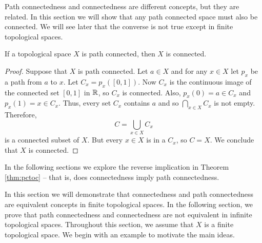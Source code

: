 \label{sec_connectedness}

Path connectedness and connectedness are different concepts, but they are related. In this section we will show that any path connected space must also be connected. We will see later that the converse is not true except in finite topological spaces. 

\begin{theorem} \label{thm:pctoc} If a topological space $X$ is path connected, then $X$ is connected.
\end{theorem}
 
\begin{proof} Suppose that $X$ is path connected. Let $a \in X$ and for any $x \in X$ let $p_x$ be a path from $a$ to $x$. Let $C_x = p_x([0,1])$. Now $C_x$ is the continuous image of the connected set $[0,1]$ in $\mathbb{R}$, so $C_x$ is connected. Also, $p_x(0) = a \in C_x$ and $p_x(1) = x \in C_x$. Thus, every set $C_x$ contains $a$ and so $\bigcap_{x \in X} C_x$ is not empty. Therefore, 
\[C = \bigcup_{x \in X} C_x\]
is a connected subset of $X$. But every $x \in X$ is in a $C_x$, so $C = X$. We conclude that $X$ is connected. 
\end{proof}

In the following sections we explore the reverse implication in Theorem \ref{thm:pctoc} -- that is, does connectedness imply path connectedness. 

\label{sec_connect_finite}

In this section we will demonstrate that connectedness and path connectedness are equivalent concepts in finite topological spaces. In the following section, we prove that path connectedness and connectedness are not equivalent in infinite topological spaces. Throughout this section, we assume that $X$ is a finite topological space. We begin with an example to motivate the main ideas. 

